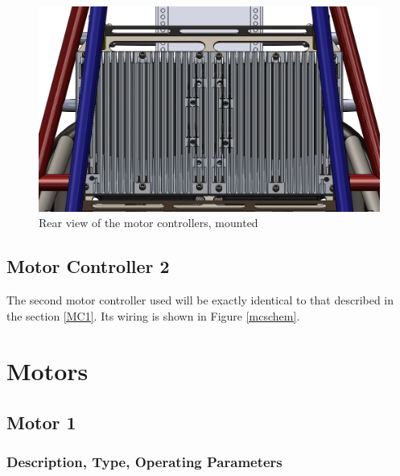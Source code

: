 \documentclass{article}
\begin{document}
            \begin{figure}[H]
                \centering
                \includegraphics[width = 0.6 \textwidth]{motorcontroller_rearview}
                \caption{Rear view of the motor controllers, mounted}
                \label{mcrearview}
            \end{figure}

    \subsection{Motor Controller 2} \label{MC2}

        The second motor controller used will be exactly identical to that described in the section \ref{MC1}. Its wiring is shown in Figure \ref{mcschem}.

\newpage

\section{Motors} \label{Motors}

    \subsection{Motor 1} \label{M1}

        \subsubsection{Description, Type, Operating Parameters}

            
\end{document}
